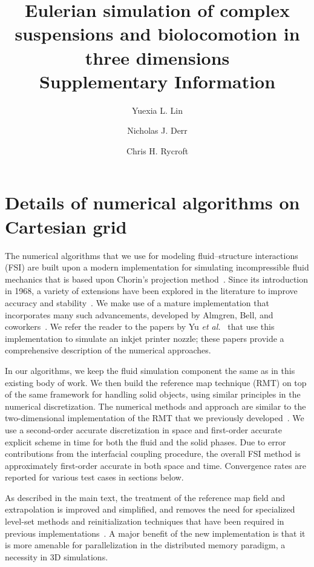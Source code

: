 \documentclass[times, 10pt]{article}
\title{Eulerian simulation of complex suspensions and biolocomotion in three dimensions\\
\huge Supplementary Information }
\author[a]{Yuexia L. Lin}
\author[a]{Nicholas J. Derr}
\author[a,b]{Chris H. Rycroft}
\affil[a]{John A. Paulson School of Engineering and Applied Sciences, Harvard University, 29 Oxford Street, Cambridge, MA 02138}
\affil[b]{Mathematics Group, Lawrence Berkeley National Laboratory, 1 Cyclotron Road, Berkeley, CA 94720}
\date{}
\begin{document}
\maketitle


\section{Details of numerical algorithms on Cartesian grid}
The numerical algorithms that we use for modeling fluid--structure interactions (FSI) are built upon a modern implementation for simulating incompressible fluid mechanics
that is based upon Chorin's projection method~\cite{chorin67, chorin68}.
Since its introduction in 1968, a variety of extensions have been explored in the literature to improve accuracy and stability~\cite{brown01}.
We make use of a mature implementation that incorporates many such advancements,
developed by Almgren, Bell, and coworkers~\cite{bell89, almgren96, almgren98, colella90, sussman99}.
We refer the reader to the papers by Yu \textit{et al.}~\cite{yu03, yu07} that use this implementation to simulate an inkjet printer nozzle;
these papers provide a comprehensive description of the numerical approaches.

In our algorithms, we keep the fluid simulation component the same as in this existing body of work.
We then build the reference map technique (RMT) on top of the same framework for handling solid objects, using similar principles in the numerical discretization.
The numerical methods and approach are similar to the two-dimensional implementation of the RMT that we previously developed~\cite{rycroft20}.
We use a second-order accurate discretization in space and first-order accurate explicit scheme in time for both the fluid and the solid phases.
Due to error contributions from the interfacial coupling procedure, the overall FSI method is approximately first-order accurate in both space and time.
Convergence rates are reported for various test cases in sections below.

As described in the main text, the treatment of the reference map field and extrapolation is improved and simplified,
and removes the need for specialized level-set methods and reinitialization techniques that have been required in previous implementations~\cite{kamrin12,valkov15,rycroft20}.
A major benefit of the new implementation is that it is more amenable for parallelization in the distributed memory paradigm, a necessity in 3D simulations.
\end{document}
